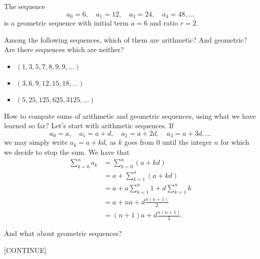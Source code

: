 \documentclass[nooutcomes]{ximera}
\begin{document}
\begin{example}
  The sequence $$a_0 = 6, \quad a_1 = 12, \quad a_3 = 24, \quad a_4 = 48,...$$is a geometric sequence with initial term $a=6$ and ratio $r=2$.
\end{example}

\begin{exploration}
  Among the following sequences, which of them are arithmetic? And geometric? Are there sequences which are neither?

  \begin{itemize}
  \item $(1,3,5,7,8,9,9,...)$
  \item $(3,6,9,12,15,18,...)$
  \item $(5,25,125,625,3125,...)$
  \end{itemize}
\end{exploration}

How to compute sums of arithmetic and geometric sequences, using what we have learned so far? Let's start with arithmetic sequences. If $$a_0 = a, \quad a_1 = a+d, \quad a_2 = a+2d, \quad a_3 = a+3d,...$$we may simply write $a_k = a+kd$, as $k$ goes from $0$ until the integer $n$ for which we decide to stop the sum.  We have that
\begin{align*}
  \sum_{k=0}^n a_k &= \sum_{k=0}^n (a+kd)  \\ &= a + \sum_{k=1}^n (a+kd) \\ &= a+a\sum_{k=1}^n1 + d\sum_{k=1}^nk \\ &= a+na + d\frac{n(n+1)}{2} \\ &= (n+1)a + d\frac{n(n+1)}{2}.
\end{align*}

And what about geometric sequences?

[CONTINUE]
\end{document}
